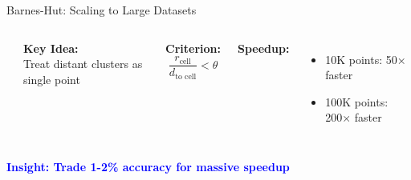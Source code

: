 \documentclass[aspectratio=169]{beamer}
\newcommand{\conceptbox}[2]{\colorbox{#1!20}{\textcolor{#1}{\textbf{#2}}}}
\newcommand{\insight}[1]{\conceptbox{blue}{Insight: #1}}
\begin{document}
\begin{frame}{Barnes-Hut: Scaling to Large Datasets}
\begin{columns}
\begin{center}
\end{center}

\textbf{Key Idea:}\\
Treat distant clusters as single point

\textbf{Criterion:}
$$\frac{r_{\text{cell}}}{d_{\text{to cell}}} < \theta$$

\textbf{Speedup:}
\begin{itemize}
\item 10K points: 50× faster
\item 100K points: 200× faster
\end{itemize}
\end{columns}

\vspace{0.3cm}
\insight{Trade 1-2\% accuracy for massive speedup}
\end{frame}
\end{document}
